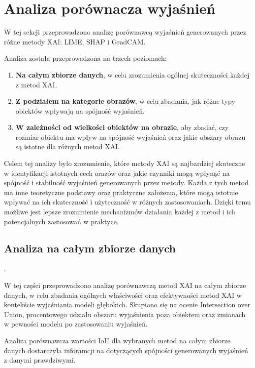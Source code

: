 \section*{Analiza porównacza wyjaśnień}
W tej sekcji przeprowadzono analizę porównawcą wyjaśnień generowanych przez różne metody XAI: LIME, SHAP i GradCAM.

Analiza została przeprowadzona na trzech poziomach:
\begin{enumerate}
	\item \textbf{Na całym zbiorze danych}, w celu zrozumienia ogólnej skuteczności każdej z metod XAI.
	\item \textbf{Z podziałem na kategorie obrazów}, w celu zbadania, jak różne typy obiektów wpływają na spójność wyjaśnień.
	\item \textbf{W zależności od wielkości obiektów na obrazie}, aby zbadać, czy rozmiar obiektu ma wpływ na spójność wyjaśnień oraz jakie obszary obrazu są istotne dla różnych metod XAI.
\end{enumerate}

Celem tej analizy było zrozumienie, które metody XAI są najbardziej skuteczne w identyfikacji istotnych cech orazów oraz jakie czynniki mogą wpłynąć na spójność i stabilność wyjaśnień generowanych przez metody.
Każda z tych metod ma inne teoretyczne podstawy oraz praktyczne założenia, które mogą istotnie wpływać na ich skuteczność i użyteczność w różnych zastosowaniach.
Dzięki temu możliwe jest lepsze zrozumienie mechanizmów działania każdej z metod i ich potencjalnych zastosowań w praktyce.

\subsection*{Analiza na całym zbiorze danych}.

W tej części przeprowadzono analizę porównawczą metod XAI na całym zbiorze danych, w celu zbadania ogólnych właściwości oraz efektywności metod XAI w kontekście wyjaśniania modeli głębokich.
Skupiono się na ocenie Intersection over Union, procentowego udziału obszaru wyjaśnienia poza obiektem oraz zmianach w pewności modelu po zastosowaniu wyjaśnień.

\vspace{1cm}

Analiza porównawcza wartości IoU dla wybranych metod na całym zbiorze danych dostarczyła inforamcji na dotyczących spójności generowanych wyjaśnień z danymi prawdziwymi.

